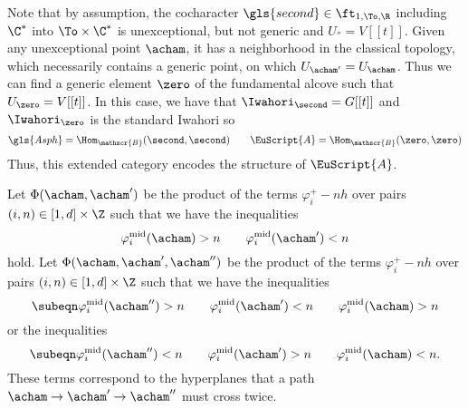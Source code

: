 Note that by assumption, the
cocharacter $\gls{second}\in \ft_{1,
  \To,\R} $ including $\C^*$ into $\To\times
\C^*$ is unexceptional, but not generic and  $U_{\second}=V[[t]]$.
Given any unexceptional point $\acham$, it has a neighborhood in the
classical topology, which necessarily contains a generic point, on
which $U_{\acham'}=U_{\acham}$. Thus we can find a generic element $\zero$ of the fundamental alcove such that $U_\zero=V[[t]]$. In this case, we
have that $\Iwahori_\second=G[[t]]$ and $\Iwahori_\zero$ is the standard Iwahori so \begin{equation}\label{eq:A-B}
    \gls{Asph}=\Hom_{\mathscr{B}}(\second,\second)\qquad \EuScript{A}=\Hom_{{\mathscr{B}}}(\zero,\zero)
\end{equation}  Thus, this extended category encodes the structure of $\EuScript{A}$.
\begin{definition}
  Let $\Phi(\acham,\acham')$ be the product of the terms
  $\varphi^+_i-nh$ over pairs $(i,n) \in [1,d]\times \Z$ such that we
  have the inequalities
  \[\varphi_i^{\operatorname{mid}}(\acham)>n \qquad \varphi_i^{\operatorname{mid}}(\acham')<n \] hold.   Let
  $\Phi(\acham,\acham',\acham'')$ be the product of the terms
  $\varphi^+_i-nh$ over pairs $(i,n)\in [1,d]\times \Z$ such that we
  have the inequalities \newseq
  \[\subeqn\label{pmp}\varphi_i^{\operatorname{mid}}(\acham'')>n \qquad
    \varphi_i^{\operatorname{mid}}(\acham')<n \qquad \varphi_i^{\operatorname{mid}}(\acham)>n\] or the inequalities
  \[\subeqn\label{mpm}\varphi_i^{\operatorname{mid}}(\acham'')<n \qquad
    \varphi_i^{\operatorname{mid}}(\acham')>n\qquad \varphi_i^{\operatorname{mid}}(\acham)<n. \] These terms correspond to the hyperplanes that a path
  $\acham\to\acham'\to \acham''$ must cross twice. 
\end{definition}



